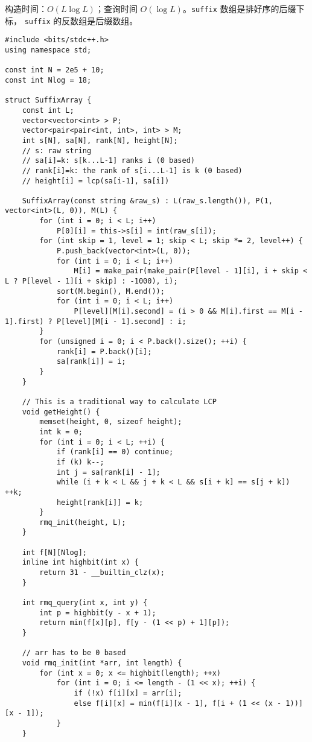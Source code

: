 \documentclass[]{article}
\begin{document}
构造时间：\(O(L \log L)\)；查询时间 \(O(\log L)\)。\texttt{suffix}
数组是排好序的后缀下标， \texttt{suffix} 的反数组是后缀数组。

\begin{verbatim}
#include <bits/stdc++.h>
using namespace std;

const int N = 2e5 + 10;
const int Nlog = 18;

struct SuffixArray {
    const int L;
    vector<vector<int> > P;
    vector<pair<pair<int, int>, int> > M;
    int s[N], sa[N], rank[N], height[N];
    // s: raw string
    // sa[i]=k: s[k...L-1] ranks i (0 based)
    // rank[i]=k: the rank of s[i...L-1] is k (0 based)
    // height[i] = lcp(sa[i-1], sa[i])

    SuffixArray(const string &raw_s) : L(raw_s.length()), P(1, vector<int>(L, 0)), M(L) {
        for (int i = 0; i < L; i++)
            P[0][i] = this->s[i] = int(raw_s[i]);
        for (int skip = 1, level = 1; skip < L; skip *= 2, level++) {
            P.push_back(vector<int>(L, 0));
            for (int i = 0; i < L; i++)
                M[i] = make_pair(make_pair(P[level - 1][i], i + skip < L ? P[level - 1][i + skip] : -1000), i);
            sort(M.begin(), M.end());
            for (int i = 0; i < L; i++)
                P[level][M[i].second] = (i > 0 && M[i].first == M[i - 1].first) ? P[level][M[i - 1].second] : i;
        }
        for (unsigned i = 0; i < P.back().size(); ++i) {
            rank[i] = P.back()[i];
            sa[rank[i]] = i;
        }
    }

    // This is a traditional way to calculate LCP
    void getHeight() {
        memset(height, 0, sizeof height);
        int k = 0;
        for (int i = 0; i < L; ++i) {
            if (rank[i] == 0) continue;
            if (k) k--;
            int j = sa[rank[i] - 1];
            while (i + k < L && j + k < L && s[i + k] == s[j + k]) ++k;
            height[rank[i]] = k;
        }
        rmq_init(height, L);
    }

    int f[N][Nlog];
    inline int highbit(int x) {
        return 31 - __builtin_clz(x);
    }

    int rmq_query(int x, int y) {
        int p = highbit(y - x + 1);
        return min(f[x][p], f[y - (1 << p) + 1][p]);
    }

    // arr has to be 0 based
    void rmq_init(int *arr, int length) {
        for (int x = 0; x <= highbit(length); ++x)
            for (int i = 0; i <= length - (1 << x); ++i) {
                if (!x) f[i][x] = arr[i];
                else f[i][x] = min(f[i][x - 1], f[i + (1 << (x - 1))][x - 1]);
            }
    }


\end{verbatim}
\end{document}
